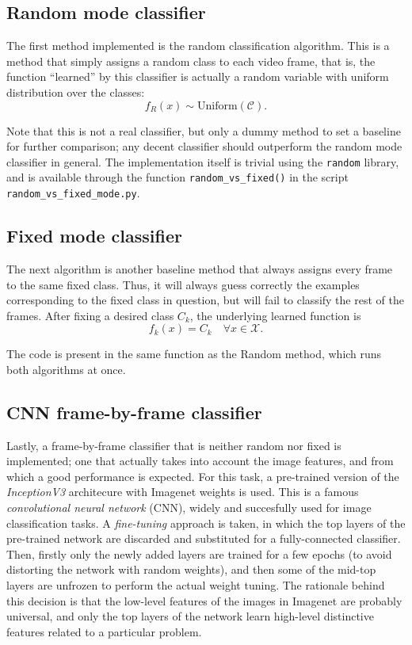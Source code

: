 \documentclass[letterpaper, 10 pt, conference]{IEEEtran}
\begin{document}
\subsection{Random mode classifier}

The first method implemented is the random classification algorithm. This is a method that simply assigns a random class to each video frame, that is, the function ``learned'' by this classifier is actually a random variable with uniform distribution over the classes: \[
f_R(x) \sim \text{Uniform}(\mathcal C).\]

Note that this is not a real classifier, but only a dummy method to set a baseline for further comparison; any decent classifier should outperform the random mode classifier in general. The implementation itself is trivial using the \texttt{random} library, and is available through the function \texttt{random\_vs\_fixed()} in the script \texttt{random\_vs\_fixed\_mode.py}.

\subsection{Fixed mode classifier}

The next algorithm is another baseline method that always assigns every frame to the same fixed class. Thus, it will always guess correctly the examples corresponding to the fixed class in question, but will fail to classify the rest of the frames. After fixing a desired class $C_k$, the underlying learned function is
\[
f_k(x) = C_k \quad \forall x \in \mathcal X.
\]

The code is present in the same function as the Random method, which runs both algorithms at once.

\subsection{CNN frame-by-frame classifier}

Lastly, a frame-by-frame classifier that is neither random nor fixed is implemented; one that actually takes into account the image features, and from which a good performance is expected. For this task, a pre-trained version of the \textit{InceptionV3} architecure \cite{inception} with Imagenet weights is used. This is a famous \textit{convolutional neural network} (CNN), widely and succesfully used for image classification tasks. A \textit{fine-tuning} approach is taken, in which the top layers of the pre-trained network are discarded and substituted for a fully-connected classifier. Then, firstly only the newly added layers are trained for a few epochs (to avoid distorting the network with random weights), and then some of the mid-top layers are unfrozen to perform the actual weight tuning. The rationale behind this decision is that the low-level features of the images in Imagenet are probably universal, and only the top layers of the network learn high-level distinctive features related to a particular problem.
\end{document}
